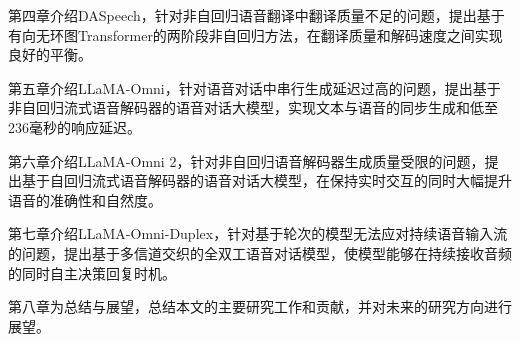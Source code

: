 第四章介绍DASpeech，针对非自回归语音翻译中翻译质量不足的问题，提出基于有向无环图Transformer的两阶段非自回归方法，在翻译质量和解码速度之间实现良好的平衡。

第五章介绍LLaMA-Omni，针对语音对话中串行生成延迟过高的问题，提出基于非自回归流式语音解码器的语音对话大模型，实现文本与语音的同步生成和低至236毫秒的响应延迟。

第六章介绍LLaMA-Omni 2，针对非自回归语音解码器生成质量受限的问题，提出基于自回归流式语音解码器的语音对话大模型，在保持实时交互的同时大幅提升语音的准确性和自然度。

第七章介绍LLaMA-Omni-Duplex，针对基于轮次的模型无法应对持续语音输入流的问题，提出基于多信道交织的全双工语音对话模型，使模型能够在持续接收音频的同时自主决策回复时机。

第八章为总结与展望，总结本文的主要研究工作和贡献，并对未来的研究方向进行展望。
